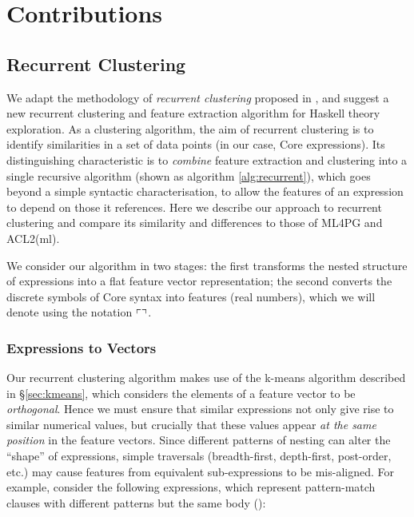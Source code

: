 \section{Contributions}
\label{sec:contributions}

\subsection{Recurrent Clustering}
\label{sec:recurrentclustering}

\iffalse TODO: Focus the section more on the problem of identifiers, and how recurrent clustering uses clustering as part of feature extraction to solve this \fi

We adapt the methodology of \emph{recurrent clustering} proposed in \citep{DBLP:journals/corr/HerasK14, heras2013proof}, and suggest a new recurrent clustering and feature extraction algorithm for Haskell \iffalse TODO: Fix the end of this sentence \fi theory exploration. As a clustering algorithm, the aim of recurrent clustering is to identify similarities in a set of data points (in our case, Core expressions). Its distinguishing characteristic is to \emph{combine} feature extraction and clustering into a single recursive algorithm (shown as algorithm \ref{alg:recurrent}), which goes beyond a simple syntactic characterisation, to allow the features of an expression to depend on those it references. Here we describe our approach to recurrent clustering and compare its similarity and differences to those of ML4PG and ACL2(ml).

We consider our algorithm in two stages: the first transforms the nested structure of expressions into a flat feature vector representation; the second converts the discrete symbols of Core syntax into features (real numbers), which we will denote using the notation $\left\ulcorner  \right\urcorner$.

\subsubsection{Expressions to Vectors}

Our recurrent clustering algorithm makes use of the k-means algorithm described in \S \ref{sec:kmeans}, which considers the elements of a feature vector to be \emph{orthogonal}. Hence we must ensure that similar expressions not only give rise to similar numerical values, but crucially that these values appear \emph{at the same position} in the feature vectors. Since different patterns of nesting can alter the ``shape'' of expressions, simple traversals (breadth-first, depth-first, post-order, etc.) may cause features from equivalent sub-expressions to be mis-aligned. For example, consider the following expressions, which represent pattern-match clauses with different patterns but the same body ():

